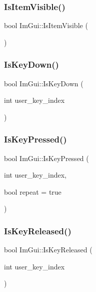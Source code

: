 \subsubsection{\texorpdfstring{Is\+Item\+Visible()}{IsItemVisible()}}
{\footnotesize\ttfamily bool Im\+Gui\+::\+Is\+Item\+Visible (\begin{DoxyParamCaption}{ }\end{DoxyParamCaption})}

\mbox{\label{namespace_im_gui_a633d848504c89e7756ddd33474bc78d2}} 
\subsubsection{\texorpdfstring{Is\+Key\+Down()}{IsKeyDown()}}
{\footnotesize\ttfamily bool Im\+Gui\+::\+Is\+Key\+Down (\begin{DoxyParamCaption}\item[{int}]{user\+\_\+key\+\_\+index }\end{DoxyParamCaption})}

\mbox{\label{namespace_im_gui_a83331a8afa5316bc98ed9c98b151ac01}} 
\subsubsection{\texorpdfstring{Is\+Key\+Pressed()}{IsKeyPressed()}}
{\footnotesize\ttfamily bool Im\+Gui\+::\+Is\+Key\+Pressed (\begin{DoxyParamCaption}\item[{int}]{user\+\_\+key\+\_\+index,  }\item[{bool}]{repeat = {\ttfamily true} }\end{DoxyParamCaption})}

\mbox{\label{namespace_im_gui_a3fb25247181c5c292fe4f932bd20de88}} 
\subsubsection{\texorpdfstring{Is\+Key\+Released()}{IsKeyReleased()}}
{\footnotesize\ttfamily bool Im\+Gui\+::\+Is\+Key\+Released (\begin{DoxyParamCaption}\item[{int}]{user\+\_\+key\+\_\+index }\end{DoxyParamCaption})}

